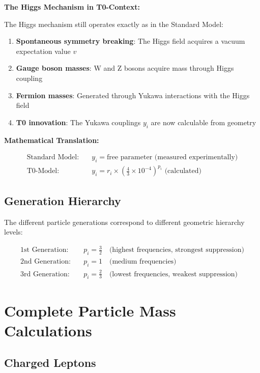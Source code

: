 \documentclass[12pt,a4paper]{article}
\begin{document}
	\textbf{The Higgs Mechanism in T0-Context:}
	
	The Higgs mechanism still operates exactly as in the Standard Model:
	
	\begin{enumerate}
		\item \textbf{Spontaneous symmetry breaking}: The Higgs field acquires a vacuum expectation value $v$
		\item \textbf{Gauge boson masses}: W and Z bosons acquire mass through Higgs coupling
		\item \textbf{Fermion masses}: Generated through Yukawa interactions with the Higgs field
		\item \textbf{T0 innovation}: The Yukawa couplings $y_i$ are now calculable from geometry
	\end{enumerate}
	
	\textbf{Mathematical Translation:}
	
	\begin{align}
		\text{Standard Model:} \quad &y_i = \text{free parameter (measured experimentally)} \\
		\text{T0-Model:} \quad &y_i = r_i \times \left(\frac{4}{3} \times 10^{-4}\right)^{p_i} \text{ (calculated)}
	\end{align}
	
	\subsection{Generation Hierarchy}
	\label{subsec:generation_hierarchy}
	
	The different particle generations correspond to different geometric hierarchy levels:
	
	\begin{align}
		\text{1st Generation:} \quad &p_i = \frac{3}{2} \quad \text{(highest frequencies, strongest suppression)} \\
		\text{2nd Generation:} \quad &p_i = 1 \quad \text{(medium frequencies)} \\
		\text{3rd Generation:} \quad &p_i = \frac{2}{3} \quad \text{(lowest frequencies, weakest suppression)}
	\end{align}
	
	\section{Complete Particle Mass Calculations}
	\label{sec:complete_calculations}
	
	\subsection{Charged Leptons}
	\label{subsec:charged_leptons}
	
\end{document}
